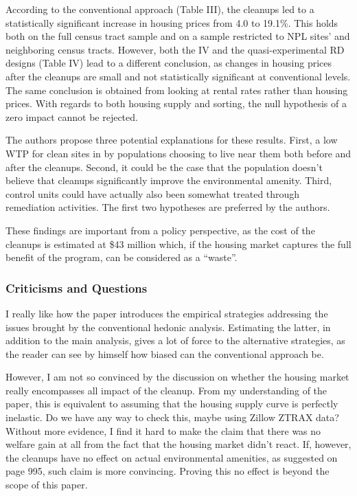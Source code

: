 \documentclass[12pt, final]{article}
\begin{document}
According to the conventional approach (Table III), the cleanups led to a statistically significant increase in housing prices from 4.0 to 19.1\%. This holds both on the full census tract sample and on a sample restricted to NPL sites’ and neighboring census tracts. However, both the IV and the quasi-experimental RD designs (Table IV) lead to a different conclusion, as changes in housing prices after the cleanups are small and not statistically significant at conventional levels. The same conclusion is obtained from looking at rental rates rather than housing prices. With regards to both housing supply and sorting, the null hypothesis of a zero impact cannot be rejected. 

The authors propose three potential explanations for these results. First, a low WTP for clean sites in by populations choosing to live near them both before and after the cleanups. Second, it could be the case that the population doesn’t believe that cleanups significantly improve the environmental amenity. Third, control units could have actually also been somewhat treated through remediation activities. The first two hypotheses are preferred by the authors.

These findings are important from a policy perspective, as the cost of the cleanups is estimated at \$43 million which, if the housing market captures the full benefit of the program, can be considered as a “waste”.



\subsubsection*{Criticisms and Questions} %
\label{ssub:criticisms_and_questions}

I really like how the paper introduces the empirical strategies addressing the issues brought by the conventional hedonic analysis. Estimating the latter, in addition to the main analysis, gives a lot of force to the alternative strategies, as the reader can see by himself how biased can the conventional approach be.

However, I am not so convinced by the discussion on whether the housing market really encompasses all impact of the cleanup. From my understanding of the paper, this is equivalent to assuming that the housing supply curve is perfectly inelastic. Do we have any way to check this, maybe using Zillow ZTRAX data? 
Without more evidence, I find it hard to make the claim that there was no welfare gain at all from the fact that the housing market didn't react. If, however, the cleanups have no effect on actual environmental amenities, as suggested on page 995, such claim is more convincing. Proving this no effect is beyond the scope of this paper.
\end{document}
